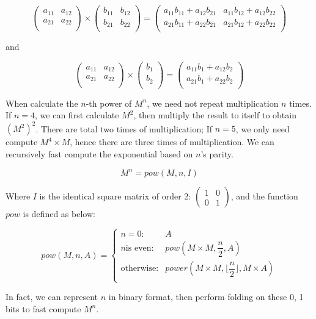 \documentclass[UTF8]{article}
\begin{document}
\begin{enumerate}
\[
\begin{pmatrix}
a_{11} & a_{12} \\
a_{21} & a_{22} \\
\end{pmatrix}
\times
\begin{pmatrix}
b_{11} & b_{12} \\
b_{21} & b_{22} \\
\end{pmatrix}
=
\begin{pmatrix}
a_{11} b_{11} + a_{12} b_{21} & a_{11} b_{12} + a_{12} b_{22} \\
a_{21} b_{11} + a_{22} b_{21} & a_{21} b_{12} + a_{22} b_{22} \\
\end{pmatrix}
\]

and

\[
\begin{pmatrix}
a_{11} & a_{12} \\
a_{21} & a_{22} \\
\end{pmatrix}
\times
\begin{pmatrix}
b_{1} \\
b_{2} \\
\end{pmatrix}
=
\begin{pmatrix}
a_{11} b_{1} + a_{12} b_{2} \\
a_{21} b_{1} + a_{22} b_{2} \\
\end{pmatrix}
\]

When calculate the $n$-th power of $M^n$, we need not repeat multiplication $n$ times. If $n = 4$, we can first calculate $M^2$, then multiply the result to itself to obtain $(M^2)^2$. There are total two times of multiplication; If $n = 5$, we only need compute $M^4 \times M$, hence there are three times of multiplication. We can recursively fast compute the exponential based on $n$'s parity.

\[
M^n = pow(M, n, I)
\]

Where $I$ is the identical square matrix of order 2: $\displaystyle \begin{pmatrix} 1 & 0 \\ 0 & 1\end{pmatrix}$, and the function $pow$ is defined as below:

\[
pow(M, n, A) = \begin{cases}
n = 0: & A \\
n\text{is even}: & pow(M \times M, \dfrac{n}{2}, A) \\
\text{otherwise}: & power(M \times M, \lfloor \dfrac{n}{2} \rfloor, M \times A)\\
\end{cases}
\]

In fact, we can represent $n$ in binary format, then perform folding on these 0, 1 bits to fast compute $M^n$.

\end{enumerate}
\end{document}

